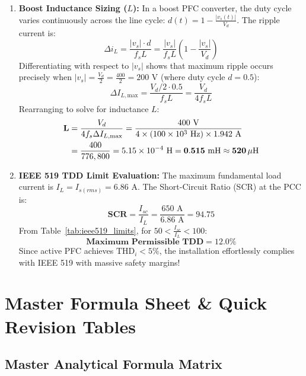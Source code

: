 \documentclass[11pt,a4paper]{article}
\begin{document}
\begin{examplebox}
\begin{enumerate}
  \item \textbf{Boost Inductance Sizing ($L$):}
  In a boost PFC converter, the duty cycle varies continuously across the line cycle: $d(t) = 1 - \frac{|v_s(t)|}{V_d}$. The ripple current is:
  \begin{equation*}
  \Delta i_L = \frac{|v_s| \cdot d}{f_s L} = \frac{|v_s|}{f_s L} \left(1 - \frac{|v_s|}{V_d}\right)
  \end{equation*}
  Differentiating with respect to $|v_s|$ shows that maximum ripple occurs precisely when $|v_s| = \frac{V_d}{2} = \frac{400}{2} = 200\text{ V}$ (where duty cycle $d = 0.5$):
  \begin{equation*}
  \Delta I_{L,\text{max}} = \frac{V_d / 2 \cdot 0.5}{f_s L} = \frac{V_d}{4 f_s L}
  \end{equation*}
  Rearranging to solve for inductance $L$:
  \begin{align*}
  \mathbf{L} &= \frac{V_d}{4 f_s \Delta I_{L,\text{max}}} = \frac{400\text{ V}}{4 \times (100 \times 10^3\text{ Hz}) \times 1.942\text{ A}} \notag\\
  &= \frac{400}{776,800} = 5.15 \times 10^{-4}\text{ H} = \mathbf{0.515\text{ mH} \approx 520\,\mu\text{H}}
  \end{align*}

  \item \textbf{IEEE 519 TDD Limit Evaluation:}
  The maximum fundamental load current is $I_L = I_{s(rms)} = 6.86\text{ A}$. The Short-Circuit Ratio (SCR) at the PCC is:
  \begin{equation*}
  \mathbf{\text{SCR}} = \frac{I_{sc}}{I_L} = \frac{650\text{ A}}{6.86\text{ A}} = \mathbf{94.75}
  \end{equation*}
  From Table~\ref{tab:ieee519_limits}, for $50 < \frac{I_{sc}}{I_L} < 100$:
  \begin{equation*}
  \mathbf{\text{Maximum Permissible TDD}} = \mathbf{12.0\%}
  \end{equation*}
  Since active PFC achieves $\text{THD}_i < 5\%$, the installation effortlessly complies with IEEE 519 with massive safety margins!
\end{enumerate}
\end{examplebox}


\section{Master Formula Sheet \& Quick Revision Tables}

\subsection{Master Analytical Formula Matrix}
\end{document}
